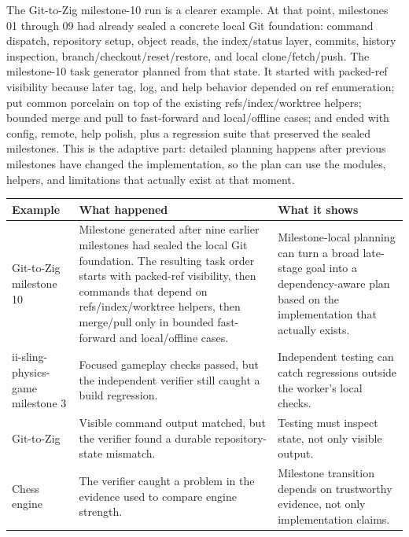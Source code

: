 \documentclass[11pt,a4paper]{article}
\renewcommand{\arraystretch}{1.18}
\newcommand{\code}[1]{#1}
\begin{document}
The \code{Git-to-Zig} milestone-10 run is a clearer example. At that point, milestones 01 through 09 had already sealed a concrete local Git foundation: command dispatch, repository setup, object reads, the index/status layer, commits, history inspection, branch/checkout/reset/restore, and local clone/fetch/push. The milestone-10 task generator planned from that state. It started with packed-ref visibility because later \code{tag}, \code{log}, and \code{help} behavior depended on ref enumeration; put common porcelain on top of the existing refs/index/worktree helpers; bounded merge and pull to fast-forward and local/offline cases; and ended with config, remote, help polish, plus a regression suite that preserved the sealed milestones. This is the adaptive part: detailed planning happens after previous milestones have changed the implementation, so the plan can use the modules, helpers, and limitations that actually exist at that moment.

\begingroup
\renewcommand{\arraystretch}{1.25}
\setlength{\tabcolsep}{6pt}
\footnotesize
\noindent\begin{tabular}{@{}p{2.8cm}p{6.3cm}p{5.5cm}@{}}
\toprule
\rowcolor{tablehead}\textbf{\color{white}Example} & \textbf{\color{white}What happened} & \textbf{\color{white}What it shows} \\
\midrule
\code{Git-to-Zig} milestone 10 & Milestone generated after nine earlier milestones had sealed the local Git foundation. The resulting task order starts with packed-ref visibility, then commands that depend on refs/index/worktree helpers, then merge/pull only in bounded fast-forward and local/offline cases. & Milestone-local planning can turn a broad late-stage goal into a dependency-aware plan based on the implementation that actually exists. \\
\rowcolor{tableband}
\code{ii-sling-physics-game} milestone 3 & Focused gameplay checks passed, but the independent verifier still caught a build regression. & Independent testing can catch regressions outside the worker's local checks. \\
\code{Git-to-Zig} & Visible command output matched, but the verifier found a durable repository-state mismatch. & Testing must inspect state, not only visible output. \\
\rowcolor{tableband}
\code{Chess engine} & The verifier caught a problem in the evidence used to compare engine strength. & Milestone transition depends on trustworthy evidence, not only implementation claims. \\
\bottomrule
\end{tabular}
\endgroup
\end{document}
